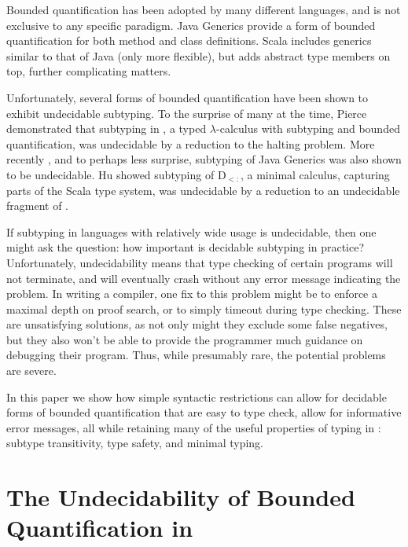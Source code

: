 \documentclass[runningheads]{llncs}
\begin{document}
Bounded quantification has been adopted by many different languages, and is not exclusive to any specific paradigm.
Java Generics provide a form of bounded quantification for both method and class definitions.
Scala includes generics similar to that of Java (only more flexible), but adds abstract type members on top, further complicating matters.

Unfortunately, several forms of bounded quantification have been shown to exhibit undecidable subtyping.
To the surprise of many at the time, Pierce \cite{fsub popl 92} demonstrated that subtyping in \Fsub, a typed $\lambda$-calculus with subtyping and bounded quantification, 
was undecidable by a reduction to the halting problem.
More recently , and to perhaps less surprise, subtyping of Java Generics was also shown to be undecidable.
Hu \cite{jason and andreij} showed subtyping of D$_{<:}$, a minimal calculus, capturing parts of the Scala type system, was undecidable by a reduction to an undecidable fragment of \Fsub.

If subtyping in languages with relatively wide usage is undecidable, then one might ask the question: how important is decidable subtyping in practice?
Unfortunately, undecidability means that type checking of certain programs will not terminate, and will eventually crash without any error message indicating the problem.
In writing a compiler, one fix to this problem might be to enforce a maximal depth on proof search, or to simply timeout during type checking. These are unsatisfying 
solutions, as not only might they exclude some false negatives, but they also won't be able to provide the programmer much guidance on debugging their program.
Thus, while presumably rare, the potential problems are severe.

In this paper we show how simple syntactic restrictions can allow for decidable forms of bounded quantification that are easy to type check, 
allow for informative error messages, all while retaining many of the useful properties of typing in \Fsub: subtype transitivity, type safety, and minimal typing.

\section{The Undecidability of Bounded Quantification in \Fsub}
\end{document}
